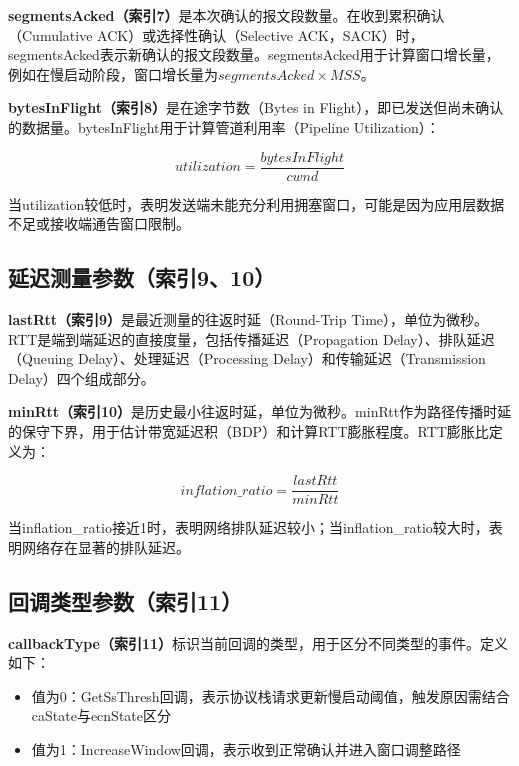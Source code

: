 \textbf{segmentsAcked（索引7）}是本次确认的报文段数量。在收到累积确认（Cumulative ACK）或选择性确认（Selective ACK，SACK）时，segmentsAcked表示新确认的报文段数量。segmentsAcked用于计算窗口增长量，例如在慢启动阶段，窗口增长量为$segmentsAcked \times MSS$。

\textbf{bytesInFlight（索引8）}是在途字节数（Bytes in Flight），即已发送但尚未确认的数据量。bytesInFlight用于计算管道利用率（Pipeline Utilization）：

\begin{equation}
utilization = \frac{bytesInFlight}{cwnd}
\end{equation}

当utilization较低时，表明发送端未能充分利用拥塞窗口，可能是因为应用层数据不足或接收端通告窗口限制。

\subsection{延迟测量参数（索引9、10）}

\textbf{lastRtt（索引9）}是最近测量的往返时延（Round-Trip Time），单位为微秒。RTT是端到端延迟的直接度量，包括传播延迟（Propagation Delay）、排队延迟（Queuing Delay）、处理延迟（Processing Delay）和传输延迟（Transmission Delay）四个组成部分。

\textbf{minRtt（索引10）}是历史最小往返时延，单位为微秒。minRtt作为路径传播时延的保守下界，用于估计带宽延迟积（BDP）和计算RTT膨胀程度。RTT膨胀比定义为：

\begin{equation}
inflation\_ratio = \frac{lastRtt}{minRtt}
\end{equation}

当inflation\_ratio接近1时，表明网络排队延迟较小；当inflation\_ratio较大时，表明网络存在显著的排队延迟。

\subsection{回调类型参数（索引11）}

\textbf{callbackType（索引11）}标识当前回调的类型，用于区分不同类型的事件。定义如下：

\begin{itemize}
    \item 值为0：GetSsThresh回调，表示协议栈请求更新慢启动阈值，触发原因需结合caState与ecnState区分
    \item 值为1：IncreaseWindow回调，表示收到正常确认并进入窗口调整路径
\end{itemize}


